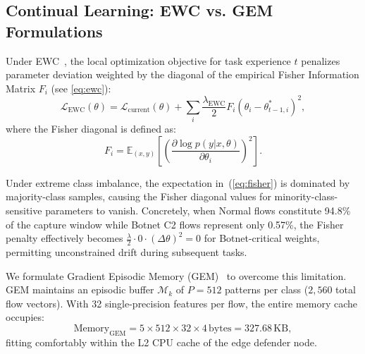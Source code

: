 \documentclass[journal,10pt,twocolumn]{IEEEtran}
\begin{document}
\subsection{Continual Learning: EWC vs. GEM Formulations}
\label{sec:continual_learning}
Under EWC~\cite{kirkpatrick2017overcoming}, the local optimization objective for task experience $t$ penalizes parameter deviation weighted by the diagonal of the empirical Fisher Information Matrix $F_i$ (see \eqref{eq:ewc}):
\begin{equation}
\mathcal{L}_{\text{EWC}}(\theta) = \mathcal{L}_{\text{current}}(\theta) + \sum_{i} \frac{\lambda_{\text{EWC}}}{2} F_i (\theta_i - \theta_{t-1, i}^*)^2,
\label{eq:ewc}
\end{equation}
where the Fisher diagonal is defined as:
\begin{equation}
F_i = \mathbb{E}_{(x,y)} \left[ \left(\frac{\partial \log p(y|x, \theta)}{\partial \theta_i}\right)^2 \right].
\label{eq:fisher}
\end{equation}

Under extreme class imbalance, the expectation in~(\ref{eq:fisher}) is dominated by majority-class samples, causing the Fisher diagonal values for minority-class-sensitive parameters to vanish. Concretely, when Normal flows constitute 94.8\% of the capture window while Botnet C2 flows represent only 0.57\%, the Fisher penalty effectively becomes $\frac{\lambda}{2} \cdot 0 \cdot (\Delta\theta)^2 = 0$ for Botnet-critical weights, permitting unconstrained drift during subsequent tasks.

We formulate Gradient Episodic Memory (GEM)~\cite{lopez2017gradient} to overcome this limitation. GEM maintains an episodic buffer $\mathcal{M}_k$ of $P=512$ patterns per class ($2,560$ total flow vectors). With 32 single-precision features per flow, the entire memory cache occupies:
\begin{equation}
\text{Memory}_{\text{GEM}} = 5 \times 512 \times 32 \times 4\,\text{bytes} = 327.68\,\text{KB},
\label{eq:gem_memory}
\end{equation}
fitting comfortably within the L2 CPU cache of the edge defender node.
\end{document}
